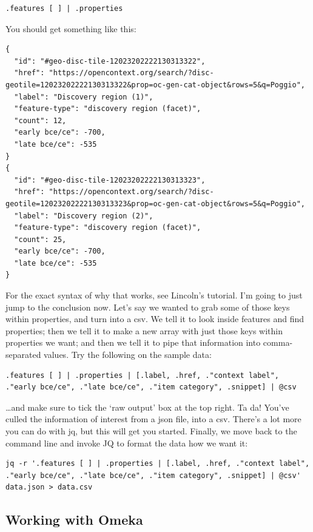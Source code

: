 \documentclass[english,]{book}
\begin{document}
\begin{verbatim}
.features [ ] | .properties
\end{verbatim}

You should get something like this:

\begin{verbatim}
{
  "id": "#geo-disc-tile-12023202222130313322",
  "href": "https://opencontext.org/search/?disc-geotile=12023202222130313322&prop=oc-gen-cat-object&rows=5&q=Poggio",
  "label": "Discovery region (1)",
  "feature-type": "discovery region (facet)",
  "count": 12,
  "early bce/ce": -700,
  "late bce/ce": -535
}
{
  "id": "#geo-disc-tile-12023202222130313323",
  "href": "https://opencontext.org/search/?disc-geotile=12023202222130313323&prop=oc-gen-cat-object&rows=5&q=Poggio",
  "label": "Discovery region (2)",
  "feature-type": "discovery region (facet)",
  "count": 25,
  "early bce/ce": -700,
  "late bce/ce": -535
}
\end{verbatim}

For the exact syntax of why that works, see Lincoln's tutorial. I'm
going to just jump to the conclusion now. Let's say we wanted to grab
some of those keys within properties, and turn into a csv. We tell it to
look inside features and find properties; then we tell it to make a new
array with just those keys within properties we want; and then we tell
it to pipe that information into comma-separated values. Try the
following on the sample data:

\begin{verbatim}
.features [ ] | .properties | [.label, .href, ."context label", ."early bce/ce", ."late bce/ce", ."item category", .snippet] | @csv
\end{verbatim}

\ldots{}and make sure to tick the `raw output' box at the top right. Ta
da! You've culled the information of interest from a json file, into a
csv. There's a lot more you can do with jq, but this will get you
started. Finally, we move back to the command line and invoke JQ to
format the data how we want it:

\begin{verbatim}
jq -r '.features [ ] | .properties | [.label, .href, ."context label", ."early bce/ce", ."late bce/ce", ."item category", .snippet] | @csv' data.json > data.csv
\end{verbatim}

\subsection{Working with Omeka}\label{working-with-omeka}
\end{document}

